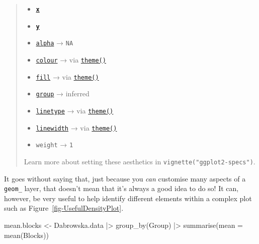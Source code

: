 \documentclass[
  letterpaper,
  DIV=11,
  numbers=noendperiod]{scrreprt}
\newenvironment{Shaded}{\begin{snugshade}}{\end{snugshade}}
\newcommand{\AttributeTok}[1]{\textcolor[rgb]{0.40,0.45,0.13}{#1}}
\newcommand{\FunctionTok}[1]{\textcolor[rgb]{0.28,0.35,0.67}{#1}}
\newcommand{\NormalTok}[1]{\textcolor[rgb]{0.00,0.23,0.31}{#1}}
\newcommand{\OtherTok}[1]{\textcolor[rgb]{0.00,0.23,0.31}{#1}}
\newcommand{\SpecialCharTok}[1]{\textcolor[rgb]{0.37,0.37,0.37}{#1}}
\providecommand{\tightlist}{%
  \setlength{\itemsep}{0pt}\setlength{\parskip}{0pt}}
\newcommand*\circled[1]{\tikz[baseline=(char.base)]{
          \node[shape=circle,draw,inner sep=1pt] (char) {{\scriptsize#1}};}}
\begin{document}
\begin{tcolorbox}
\begin{quote}
\begin{itemize}
\tightlist
\item
  \href{https://ggplot2.tidyverse.org/reference/aes_position.html}{\textbf{\texttt{x}}}
\item
  \href{https://ggplot2.tidyverse.org/reference/aes_position.html}{\textbf{\texttt{y}}}
\item
  \href{https://ggplot2.tidyverse.org/reference/aes_colour_fill_alpha.html}{\texttt{alpha}}
  → \texttt{NA}
\item
  \href{https://ggplot2.tidyverse.org/reference/aes_colour_fill_alpha.html}{\texttt{colour}}
  → via
  \href{https://ggplot2.tidyverse.org/reference/theme.html}{\texttt{theme()}}
\item
  \href{https://ggplot2.tidyverse.org/reference/aes_colour_fill_alpha.html}{\texttt{fill}}
  → via
  \href{https://ggplot2.tidyverse.org/reference/theme.html}{\texttt{theme()}}
\item
  \href{https://ggplot2.tidyverse.org/reference/aes_group_order.html}{\texttt{group}}
  → inferred
\item
  \href{https://ggplot2.tidyverse.org/reference/aes_linetype_size_shape.html}{\texttt{linetype}}
  → via
  \href{https://ggplot2.tidyverse.org/reference/theme.html}{\texttt{theme()}}
\item
  \href{https://ggplot2.tidyverse.org/reference/aes_linetype_size_shape.html}{\texttt{linewidth}}
  → via
  \href{https://ggplot2.tidyverse.org/reference/theme.html}{\texttt{theme()}}
\item
  \texttt{weight} → \texttt{1}
\end{itemize}

Learn more about setting these aesthetics in
\texttt{vignette("ggplot2-specs")}.
\end{quote}

It goes without saying that, just because you \emph{can} customise many
aspects of a \texttt{geom\_} layer, that doesn't mean that it's always a
good idea to do so! It can, however, be very useful to help identify
different elements within a complex plot such as
Figure~\ref{fig-UsefulDensityPlot}.

\protect{}\label{annotated-cell-469}%
\begin{Shaded}
\begin{Highlighting}[]
\NormalTok{mean.blocks }\OtherTok{\textless{}{-}}\NormalTok{ Dabrowska.data }\SpecialCharTok{|\textgreater{}} \hspace*{\fill}\NormalTok{\circled{1}}
  \FunctionTok{group\_by}\NormalTok{(Group) }\SpecialCharTok{|\textgreater{}}
  \FunctionTok{summarise}\NormalTok{(}\AttributeTok{mean =} \FunctionTok{mean}\NormalTok{(Blocks))}


\end{Highlighting}
\end{Shaded}
\end{tcolorbox}
\end{document}
